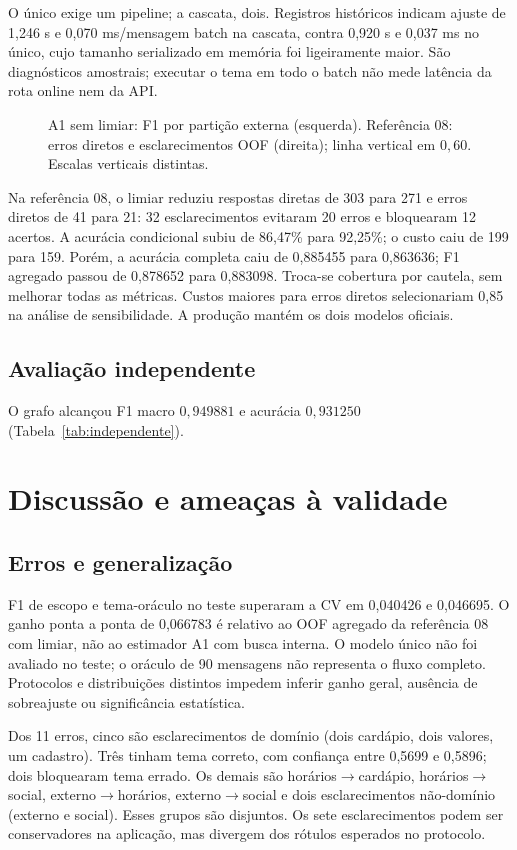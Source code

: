 \documentclass[12pt]{article}
\begin{document}
O único exige um pipeline; a cascata, dois. Registros históricos indicam
ajuste de 1,246 s e 0,070 ms/mensagem batch na cascata, contra 0,920 s e
0,037 ms no único, cujo tamanho serializado em memória foi ligeiramente maior.
São diagnósticos amostrais; executar o tema em todo o batch não mede latência
da rota online nem da API.

\begin{figure}[!htb]
\centering

\caption{A1 sem limiar: F1 por partição externa (esquerda).
Referência 08: erros diretos e esclarecimentos OOF (direita);
linha vertical em \(0{,}60\). Escalas verticais distintas.}
\label{fig:a1}
\end{figure}
Na referência 08, o limiar reduziu respostas diretas de 303 para 271 e erros
diretos de 41 para 21: 32 esclarecimentos evitaram 20 erros e bloquearam
12 acertos. A acurácia condicional subiu de 86,47\% para 92,25\%;
o custo caiu de 199 para 159. Porém, a acurácia completa caiu de 0,885455
para 0,863636; F1 agregado passou de 0,878652 para 0,883098.
Troca-se cobertura por cautela, sem melhorar todas as métricas.
Custos maiores para erros diretos selecionariam 0,85 na análise de sensibilidade.
A produção mantém os dois modelos oficiais.

\subsection{Avaliação independente}
O grafo alcançou F1 macro \(0{,}949881\) e acurácia \(0{,}931250\)
(Tabela~\ref{tab:independente}).


\section{Discussão e ameaças à validade}
\subsection{Erros e generalização}
F1 de escopo e tema-oráculo no teste superaram a CV em 0,040426 e 0,046695.
O ganho ponta a ponta de 0,066783 é relativo ao OOF agregado da referência 08
com limiar, não ao estimador A1 com busca interna. O modelo único não foi
avaliado no teste; o oráculo de 90 mensagens não representa o fluxo completo.
Protocolos e distribuições distintos impedem inferir ganho geral, ausência de
sobreajuste ou significância estatística.

Dos 11 erros, cinco são esclarecimentos de domínio (dois cardápio, dois valores,
um cadastro). Três tinham tema correto, com confiança entre 0,5699 e 0,5896;
dois bloquearam tema errado. Os demais são horários$\to$cardápio,
horários$\to$social, externo$\to$horários, externo$\to$social e dois
esclarecimentos não-domínio (externo e social). Esses grupos são disjuntos.
Os sete esclarecimentos podem ser conservadores na aplicação, mas divergem
dos rótulos esperados no protocolo.
\end{document}
